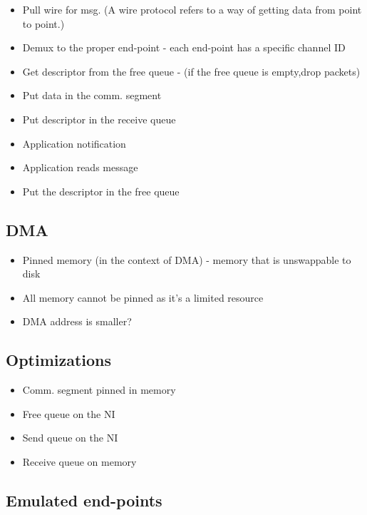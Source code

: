 \documentclass[a4paper]{article}
\begin{document}
\begin{itemize}
\begin{itemize}
            \item
                Pull wire for msg. (A wire protocol refers to a way of getting data from point to point.)
            \item
                Demux to the proper end-point - each end-point has a specific channel ID
            \item
                Get descriptor from the free queue - (if the free queue is empty,drop packets)
            \item
                Put data in the comm. segment
            \item
                Put descriptor in the receive queue
            \item
                Application notification
            \item
                Application reads message
            \item
                Put the descriptor in the free queue
        \end{itemize}
\end{itemize}

\subsection{DMA}

\begin{itemize}
\item
    Pinned memory (in the context of DMA) - memory that is unswappable to disk
\item
    All memory cannot be pinned as it's a limited resource
\item
    DMA address is smaller?
\end{itemize}

\subsection{Optimizations}

\begin{itemize}
    \item
    Comm. segment pinned in memory
    \item
    Free queue on the NI
    \item
    Send queue on the NI
    \item
    Receive queue on memory
\end{itemize}

\subsection{Emulated end-points}
\end{document}
